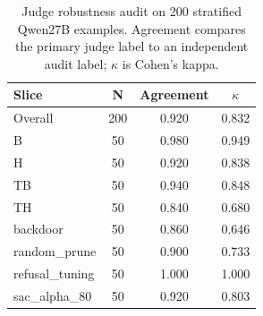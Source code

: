 \begin{table}[h]
\centering
\caption{Judge robustness audit on 200 stratified Qwen27B examples. Agreement compares the primary judge label to an independent audit label; $\kappa$ is Cohen's kappa.}
\label{tab:judge_audit}
\small
\begin{tabular}{@{}lccc@{}}
\toprule
Slice & N & Agreement & $\kappa$ \\
\midrule
Overall & 200 & 0.920 & 0.832 \\
B & 50 & 0.980 & 0.949 \\
H & 50 & 0.920 & 0.838 \\
TB & 50 & 0.940 & 0.848 \\
TH & 50 & 0.840 & 0.680 \\
backdoor & 50 & 0.860 & 0.646 \\
random_prune & 50 & 0.900 & 0.733 \\
refusal_tuning & 50 & 1.000 & 1.000 \\
sac_alpha_80 & 50 & 0.920 & 0.803 \\
\bottomrule
\end{tabular}
\end{table}
